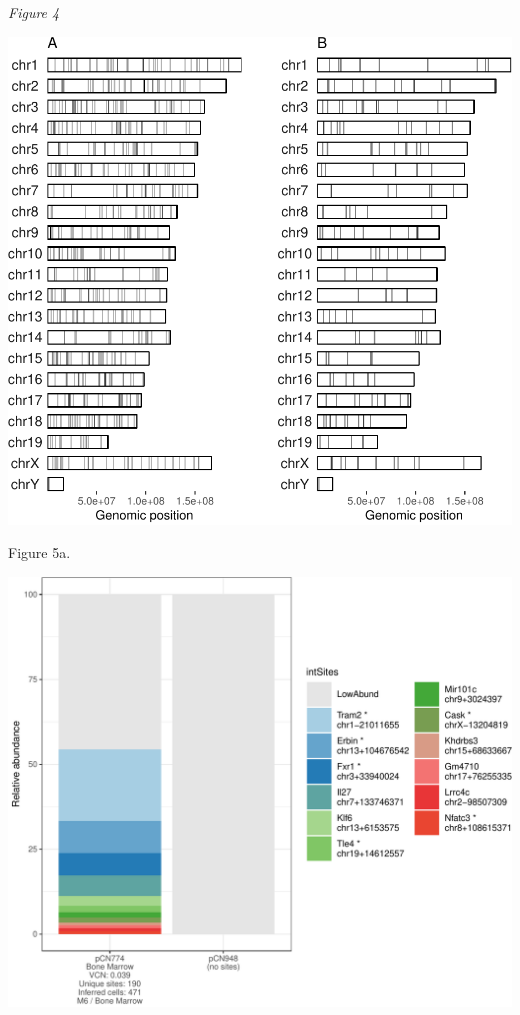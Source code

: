 \documentclass[12pt,]{article}
\begin{document}
\vspace{0.5cm}

\emph{Figure 4}

\vspace{0.25cm}

\includegraphics{project.group2_files/figure-latex/transplantSites-1.pdf}

\newpage

Figure 5a.

\includegraphics{project.group2_files/figure-latex/unnamed-chunk-5-1.pdf}
\vspace{1.0cm}
\end{document}
